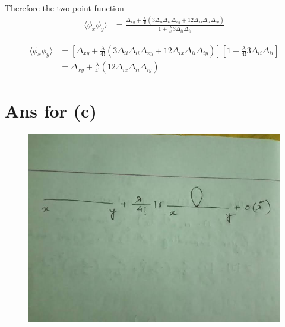 \documentclass[12pt, letterpaper]{article}
\newcommand*{\1}{\hspace{1pt}}
\begin{document}
    Therefore the two point function
    \begin{align}
        \langle \phi_{x}\phi_{y} \rangle & = \frac{\Delta_{xy} + \frac{\lambda}{4!}(3\Delta_{ii}\Delta_{ii}\Delta_{xy} + 12\Delta_{xi}\Delta_{ii}\Delta_{iy})}{1+\frac{\lambda}{4!} 3\Delta_{ii}\Delta_{ii}}
    \end{align}

     \begin{align}
        \langle \phi_{x}\phi_{y} \rangle & = [\Delta_{xy} + \frac{\lambda}{4!}( 3\Delta_{ii}\Delta_{ii}\Delta_{xy} + 12\Delta_{ix}\Delta_{ii}\Delta_{iy})][1-\frac{\lambda}{4!} 3\Delta_{ii}\Delta_{ii}] \\
        & = \Delta_{xy} + \frac{\lambda}{4!}(12\Delta_{ix}\Delta_{ii}\Delta_{iy})
    \end{align}

    \section*{Ans for (c)}

    \begin{figure}[h]
    \centering
    \includegraphics[scale=.3]{photo}
    \end{figure}
\end{document}
